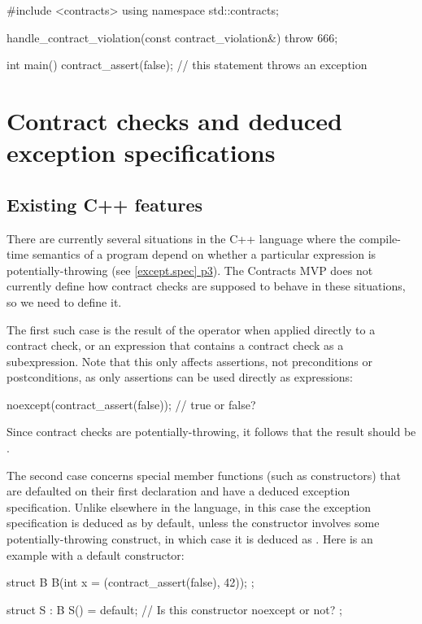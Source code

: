 \begin{codeblock}
#include <contracts>
using namespace std::contracts;

handle_contract_violation(const contract_violation&) {
  throw 666;
}

int main() {
  contract_assert(false);  // this statement throws an exception
}
\end{codeblock}

\section{Contract checks and deduced exception specifications}

\subsection{Existing C++ features}

There are currently several situations in the C++ language where the compile-time semantics of a program depend on whether a particular expression is potentially-throwing (see \href{https://eel.is/c++draft/except.spec#3}{[except.spec] p3}). The Contracts MVP does not currently define how contract checks are supposed to behave in these situations, so we need to define it.

The first such case is the result of the  operator when applied directly to a contract check, or an expression that contains a contract check as a subexpression. Note that this only affects assertions, not preconditions or postconditions, as only assertions can be used directly as expressions:

\begin{codeblock}
noexcept(contract_assert(false));   // true or false?
\end{codeblock}

Since contract checks are potentially-throwing, it follows that the result should be .

The second case concerns special member functions (such as constructors) that are defaulted on their first declaration and have a deduced exception specification. Unlike elsewhere in the language, in this case the exception specification is deduced as  by default, unless the constructor involves some potentially-throwing construct, in which case it is deduced as . Here is an example with a default constructor:

\begin{codeblock}
struct B {
  B(int x = (contract_assert(false), 42));
};

struct S : B {
  S() = default;  // Is this constructor noexcept or not?
};
\end{codeblock}

